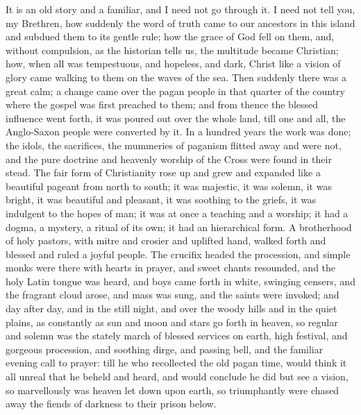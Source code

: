 It is an old story and a familiar, and I need not go
through it. I need not tell you, my Brethren, how
suddenly the word of truth came to our ancestors in this
island and subdued them to its gentle rule; how the grace
of God fell on them, and, without compulsion, as the
historian tells us, the multitude became Christian; how,
when all was tempestuous, and hopeless, and dark, Christ
like a vision of glory came walking to them on the waves
of the sea. Then suddenly there was a great calm; a
change came over the pagan people in that quarter of the
country where the gospel was first preached to them; and
from thence the blessed influence went forth, it was
poured out over the whole land, till one and all, the
Anglo-Saxon people were converted by it. In a hundred
years the work was done; the idols, the sacrifices, the
mummeries of paganism flitted away and were not, and the
pure doctrine and heavenly worship of the Cross were
found in their stead. The fair form of Christianity rose
up and grew and expanded like a beautiful pageant from
north to south; it was majestic, it was solemn, it was
bright, it was beautiful and pleasant, it was soothing to
the griefs, it was indulgent to the hopes of man; it was
at once a teaching and a worship; it had a dogma, a
mystery, a ritual of its own; it had an hierarchical
form. A brotherhood of holy pastors, with mitre and
crosier and uplifted hand, walked forth and blessed and
ruled a joyful people. The crucifix headed the
procession, and simple monks were there with hearts in
prayer, and sweet chants resounded, and the holy Latin
tongue was heard, and boys came forth in white, swinging
censers, and the fragrant cloud arose, and mass was sung,
and the saints were invoked; and day after day, and in
the still night, and over the woody hills and in the
quiet plains, as constantly as sun and moon and stars go
forth in heaven, so regular and solemn was the stately
march of blessed services on earth, high festival, and
gorgeous procession, and soothing dirge, and passing
bell, and the familiar evening call to prayer: till he
who recollected the old pagan time, would think it all
unreal that he beheld and heard, and would conclude he
did but see a vision, so marvellously was heaven let down
upon earth, so triumphantly were chased away the fiends
of darkness to their prison below.

